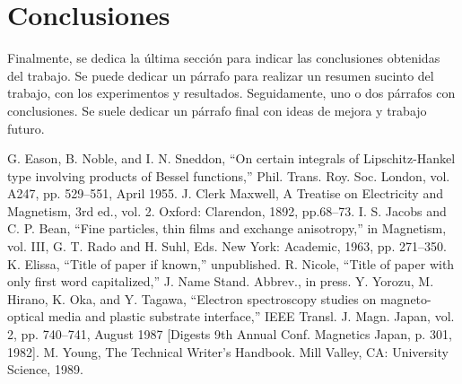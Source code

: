 \documentclass[conference,a4paper]{IEEEtran}
\begin{document}
\section{Conclusiones}

Finalmente, se dedica la última sección para indicar las conclusiones obtenidas
del trabajo. Se puede dedicar un párrafo para realizar un resumen sucinto del
trabajo, con los experimentos y resultados. Seguidamente, uno o dos párrafos
con conclusiones. Se suele dedicar un párrafo final con ideas de mejora y
trabajo futuro.


\begin{thebibliography}{00}
 G. Eason, B. Noble, and I. N. Sneddon, ``On certain integrals of Lipschitz-Hankel type involving products of Bessel functions,'' Phil. Trans. Roy. Soc. London, vol. A247, pp. 529--551, April 1955.
 J. Clerk Maxwell, A Treatise on Electricity and Magnetism, 3rd ed., vol. 2. Oxford: Clarendon, 1892, pp.68--73.
 I. S. Jacobs and C. P. Bean, ``Fine particles, thin films and exchange anisotropy,'' in Magnetism, vol. III, G. T. Rado and H. Suhl, Eds. New York: Academic, 1963, pp. 271--350.
 K. Elissa, ``Title of paper if known,'' unpublished.
 R. Nicole, ``Title of paper with only first word capitalized,'' J. Name Stand. Abbrev., in press.
 Y. Yorozu, M. Hirano, K. Oka, and Y. Tagawa, ``Electron spectroscopy studies on magneto-optical media and plastic substrate interface,'' IEEE Transl. J. Magn. Japan, vol. 2, pp. 740--741, August 1987 [Digests 9th Annual Conf. Magnetics Japan, p. 301, 1982].
 M. Young, The Technical Writer's Handbook. Mill Valley, CA: University Science, 1989.
\end{thebibliography}
\end{document}
